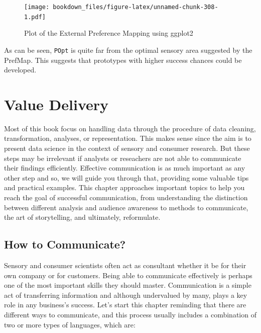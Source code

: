 \documentclass[
]{krantz}
\renewenvironment{quote}{\begin{VF}}{\end{VF}}
\begin{document}
\begin{figure}
\centering
\texttt{[image: bookdown\_files/figure-latex/unnamed-chunk-308-1.pdf]}
\caption{\label{fig:unnamed-chunk-308}Plot of the External Preference Mapping using ggplot2}
\end{figure}

As can be seen, \texttt{POpt} is quite far from the optimal sensory area suggested by the PrefMap. This suggests that prototypes with higher success chances could be developed.

\hypertarget{value-delivery}{%
\chapter{Value Delivery}\label{value-delivery}}

\begin{quote}
Most of this book focus on handling data through the procedure of data cleaning, transformation, analyses, or representation. This makes sense since the aim is to present data science in the context of sensory and consumer research. But these steps may be irrelevant if analysts or reseachers are not able to communicate their findings efficiently. Effective communication is as much important as any other step and so, we will guide you through that, providing some valuable tips and practical examples. This chapter approaches important topics to help you reach the goal of successful communication, from understanding the distinction between different analysis and audience awareness to methods to communicate, the art of storytelling, and ultimately, reformulate.
\end{quote}

\hypertarget{how-to-communicate}{%
\section{How to Communicate?}\label{how-to-communicate}}

Sensory and consumer scientists often act as consultant whether it be for their own company or for customers. Being able to communicate effectively is perhaps one of the most important skills they should master. Communication is a simple act of transferring information and although undervalued by many, plays a key role in any business's success. Let's start this chapter reminding that there are different ways to communicate, and this process usually includes a combination of two or more types of languages, which are:
\end{document}
